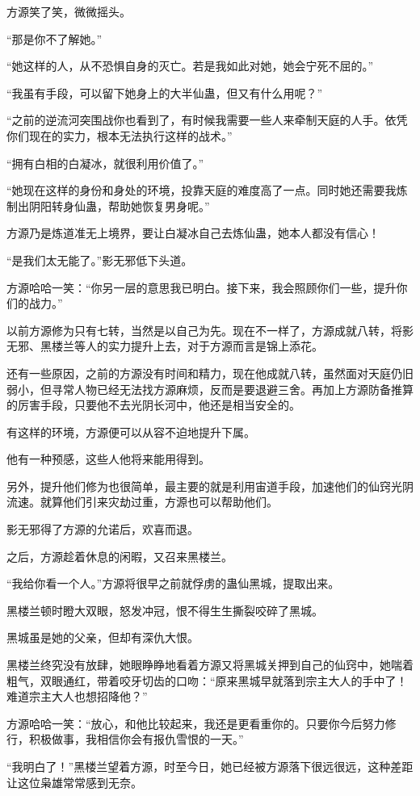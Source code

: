 \begin{this_body}
方源笑了笑，微微摇头。

“那是你不了解她。”

“她这样的人，从不恐惧自身的灭亡。若是我如此对她，她会宁死不屈的。”

“我虽有手段，可以留下她身上的大半仙蛊，但又有什么用呢？”

“之前的逆流河突围战你也看到了，有时候我需要一些人来牵制天庭的人手。依凭你们现在的实力，根本无法执行这样的战术。”

“拥有白相的白凝冰，就很利用价值了。”

“她现在这样的身份和身处的环境，投靠天庭的难度高了一点。同时她还需要我炼制出阴阳转身仙蛊，帮助她恢复男身呢。”

方源乃是炼道准无上境界，要让白凝冰自己去炼仙蛊，她本人都没有信心！

“是我们太无能了。”影无邪低下头道。

方源哈哈一笑：“你另一层的意思我已明白。接下来，我会照顾你们一些，提升你们的战力。”

以前方源修为只有七转，当然是以自己为先。现在不一样了，方源成就八转，将影无邪、黑楼兰等人的实力提升上去，对于方源而言是锦上添花。

还有一些原因，之前的方源没有时间和精力，现在他成就八转，虽然面对天庭仍旧弱小，但寻常人物已经无法找方源麻烦，反而是要退避三舍。再加上方源防备推算的厉害手段，只要他不去光阴长河中，他还是相当安全的。

有这样的环境，方源便可以从容不迫地提升下属。

他有一种预感，这些人他将来能用得到。

另外，提升他们修为也很简单，最主要的就是利用宙道手段，加速他们的仙窍光阴流速。就算他们引来灾劫过重，方源也可以帮助他们。

影无邪得了方源的允诺后，欢喜而退。

之后，方源趁着休息的闲暇，又召来黑楼兰。

“我给你看一个人。”方源将很早之前就俘虏的蛊仙黑城，提取出来。

黑楼兰顿时瞪大双眼，怒发冲冠，恨不得生生撕裂咬碎了黑城。

黑城虽是她的父亲，但却有深仇大恨。

黑楼兰终究没有放肆，她眼睁睁地看着方源又将黑城关押到自己的仙窍中，她喘着粗气，双眼通红，带着咬牙切齿的口吻：“原来黑城早就落到宗主大人的手中了！难道宗主大人也想招降他？”

方源哈哈一笑：“放心，和他比较起来，我还是更看重你的。只要你今后努力修行，积极做事，我相信你会有报仇雪恨的一天。”

“我明白了！”黑楼兰望着方源，时至今日，她已经被方源落下很远很远，这种差距让这位枭雄常常感到无奈。

\end{this_body}

